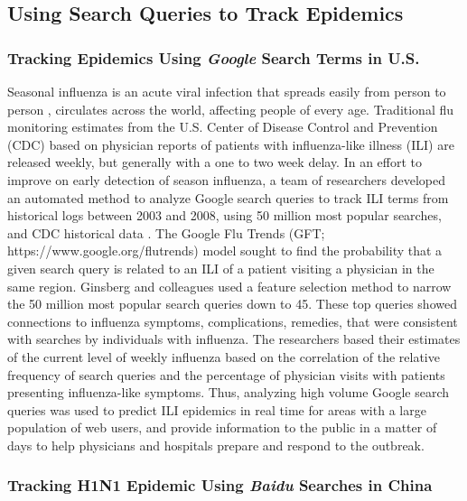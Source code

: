 \documentclass[sigconf]{acmart}
\begin{document}
\subsection{Using Search Queries to Track Epidemics}

\subsubsection{Tracking Epidemics Using {\itshape Google} Search Terms in U.S.}

Seasonal influenza is an acute viral infection that spreads easily from person to 
person , circulates across the world, affecting people of every age. Traditional 
flu monitoring estimates from the U.S. Center of Disease Control and Prevention 
(CDC) based on physician reports of patients with influenza-like illness (ILI) are 
released weekly, but generally with a one to two week delay. In an effort to improve 
on early detection of season influenza, a team of researchers developed an automated 
method to analyze Google search queries to track ILI terms from historical logs 
between 2003 and 2008, using 50 million most popular searches, and CDC historical 
data \cite{ginsburg09}. The Google Flu Trends (GFT; https://www.google.org/flutrends)
model sought to find the probability that a given search query is related to an ILI 
of a patient visiting a physician in the same region. Ginsberg and colleagues used 
a feature selection method to narrow  the 50 million most popular search queries down
to 45. These top queries showed connections to influenza symptoms, complications, 
remedies, that were consistent with searches by individuals with influenza. The 
researchers based their estimates of the current level of weekly influenza based on 
the correlation of the relative frequency of search queries and the percentage of 
physician visits with patients presenting influenza-like symptoms. Thus, analyzing 
high volume Google search queries was used to predict ILI epidemics in real time for 
areas with a large population of web users, and provide information to the public in 
a matter of days to help physicians and hospitals prepare and respond to the 
outbreak. 

\subsubsection{Tracking H1N1 Epidemic Using {\itshape Baidu} Searches in China}
\end{document}
